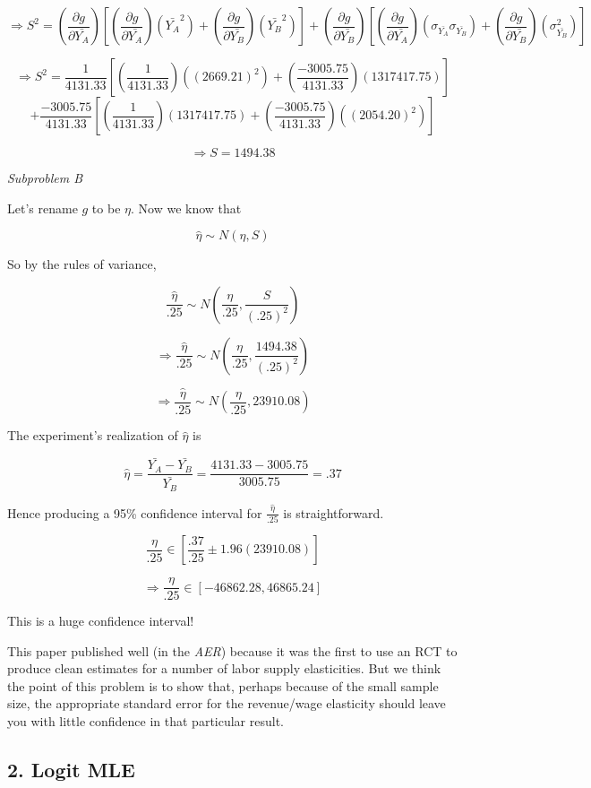 \documentclass[11pt]{article}
\begin{document}
\[\Rightarrow S^2 = (\frac{\partial g}{\partial \bar{Y_A}})[(\frac{\partial g}{\partial \bar{Y_A}})(\bar{Y_A}^2)+(\frac{\partial g}{\partial \bar{Y_B}})(\bar{Y_B}^2)] + (\frac{\partial g}{\partial \bar{Y_B}})[(\frac{\partial g}{\partial \bar{Y_A}})(\sigma_{\bar{Y_A}}\sigma_{\bar{Y_B}})+(\frac{\partial g}{\partial \bar{Y_B}})(\sigma_{\bar{Y_B}}^2)] \]

\[\Rightarrow S^2 = \frac{1}{4131.33}[(\frac{1}{4131.33})((2669.21)^2)+(\frac{-3005.75}{4131.33})(1317417.75)]\] \[+\frac{-3005.75}{4131.33}[(\frac{1}{4131.33})(1317417.75)+(\frac{-3005.75}{4131.33})((2054.20)^2)] \]

\[\Rightarrow S = 1494.38\]

\textit{Subproblem B}

\bigskip Let's rename $g$ to be $\eta$. Now we know that

\[\hat{\eta} \sim N(\eta,S) \]

So by the rules of variance,

\[\frac{\hat{\eta}}{.25} \sim N(\frac{\eta}{.25},\frac{S}{(.25)^2}) \]

\[\Rightarrow \frac{\hat{\eta}}{.25} \sim N(\frac{\eta}{.25},\frac{1494.38}{(.25)^2})\]

\[\Rightarrow \frac{\hat{\eta}}{.25} \sim N(\frac{\eta}{.25},23910.08)\]

The experiment's realization of $\hat{\eta}$ is

\[\hat{\eta}=\frac{\bar{Y_A}-\bar{Y_B}}{\bar{Y_B}}=\frac{4131.33-3005.75}{3005.75}=.37\]

Hence producing a 95\% confidence interval for $\frac{\hat{\eta}}{.25}$ is straightforward.

\[\frac{\eta}{.25} \in \left[\frac{.37}{.25}\pm1.96(23910.08)\right] \]

\[\Rightarrow \frac{\eta}{.25} \in \left[-46862.28,46865.24\right]\]

This is a huge confidence interval!

\bigskip This paper published well (in the \textit{AER}) because it was the first to use an RCT to produce clean estimates for a number of labor supply elasticities. But we think the point of this problem is to show that, perhaps because of the small sample size, the appropriate standard error for the revenue/wage elasticity should leave you with little confidence in that particular result.

\subsection*{2. Logit MLE}
\end{document}
